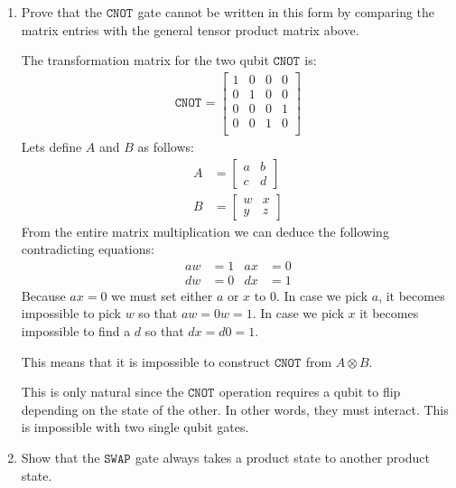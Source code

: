 \documentclass[12pt]{article}
\newcommand{\bmat}[1]{\begin{bmatrix}#1\end{bmatrix}}
\newenvironment{answer}{\begingroup\setlength{\leftskip}{-\leftmargin}\begin{framed}}{\end{framed}\endgroup}
\newcommand{\CNOT}[1]{\ensuremath{\texttt{CNOT}_{#1}}}
\newcommand{\SWAP}[1]{\ensuremath{\texttt{SWAP}_{#1}}}
\begin{document}
\begin{enumerate}
    \item Prove that the \CNOT{} gate cannot be written in this form by comparing the matrix entries with the general tensor product matrix above.

    \begin{answer}
        The transformation matrix for the two qubit \CNOT{} is:
        \begin{align*}
            \CNOT{} = \bmat{
                1 & 0 & 0 & 0 \\
                0 & 1 & 0 & 0 \\
                0 & 0 & 0 & 1 \\
                0 & 0 & 1 & 0 \\
            }
        \end{align*}
        Lets define $A$ and $B$ as follows:
        \begin{align*}
            A &= \bmat{a & b \\ c & d} \\
            B &= \bmat{w & x \\ y & z}
        \end{align*}
        From the entire matrix multiplication we can deduce the following contradicting equations:
        \begin{align*}
            aw &= 1 & ax &= 0 \\
            dw &= 0 & dx &= 1
        \end{align*}
        Because $ax = 0$ we must set either $a$ or $x$ to 0. In case we pick $a$, it becomes impossible to pick $w$ so that $aw = 0w = 1$. In case we pick $x$ it becomes impossible to find a $d$ so that $dx = d0 = 1$.

        This means that it is impossible to construct \CNOT{} from $A \otimes B$.

        This is only natural since the \CNOT{} operation requires a qubit to flip depending on the state of the other. In other words, they must interact. This is impossible with two single qubit gates.
    \end{answer}

    \item Show that the \SWAP{} gate always takes a product state to another product state.


\end{enumerate}
\end{document}
